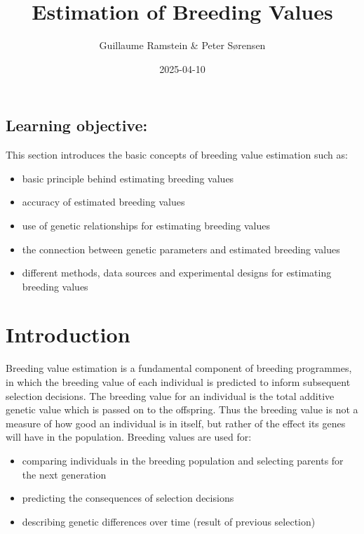 \documentclass[
]{article}
\title{Estimation of Breeding Values}
\author{Guillaume Ramstein \& Peter Sørensen}
\date{2025-04-10}
\providecommand{\tightlist}{%
  \setlength{\itemsep}{0pt}\setlength{\parskip}{0pt}}
\begin{document}
\maketitle

{
\setcounter{tocdepth}{2}
\tableofcontents
}
\subsection*{Learning objective:}\label{learning-objective}

This section introduces the basic concepts of breeding value estimation such as:

\begin{itemize}
\tightlist
\item
  basic principle behind estimating breeding values
\item
  accuracy of estimated breeding values
\item
  use of genetic relationships for estimating breeding values
\item
  the connection between genetic parameters and estimated breeding values
\item
  different methods, data sources and experimental designs for estimating breeding values
\end{itemize}

\section{Introduction}\label{introduction}

Breeding value estimation is a fundamental component of breeding programmes, in which the breeding value of each individual is predicted to inform subsequent selection decisions.
The breeding value for an individual is the total additive genetic value which is passed on to the offspring. Thus the breeding value is not a measure of how good an individual is in itself,
but rather of the effect its genes will have in the population. Breeding values are used for:

\begin{itemize}
\tightlist
\item
  comparing individuals in the breeding population and selecting parents for the next generation
\item
  predicting the consequences of selection decisions
\item
  describing genetic differences over time (result of previous selection)
\end{itemize}
\end{document}
